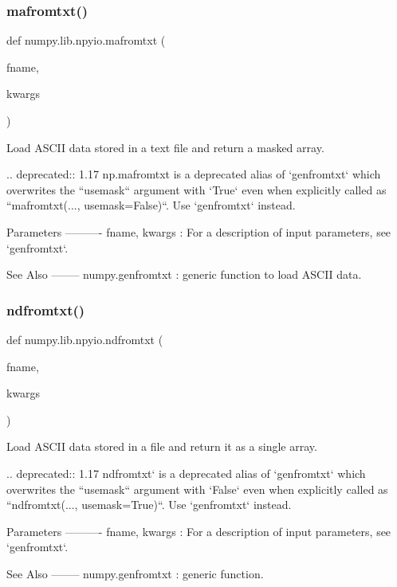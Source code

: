 \subsubsection{\texorpdfstring{mafromtxt()}{mafromtxt()}}
{\footnotesize\ttfamily def numpy.\+lib.\+npyio.\+mafromtxt (\begin{DoxyParamCaption}\item[{}]{fname,  }\item[{}]{kwargs }\end{DoxyParamCaption})}

\begin{DoxyVerb}Load ASCII data stored in a text file and return a masked array.

.. deprecated:: 1.17
    np.mafromtxt is a deprecated alias of `genfromtxt` which
    overwrites the ``usemask`` argument with `True` even when
    explicitly called as ``mafromtxt(..., usemask=False)``.
    Use `genfromtxt` instead.

Parameters
----------
fname, kwargs : For a description of input parameters, see `genfromtxt`.

See Also
--------
numpy.genfromtxt : generic function to load ASCII data.\end{DoxyVerb}
 \mbox{\label{namespacenumpy_1_1lib_1_1npyio_af96203ee43401b14ba9a590915a918b6}} 
\subsubsection{\texorpdfstring{ndfromtxt()}{ndfromtxt()}}
{\footnotesize\ttfamily def numpy.\+lib.\+npyio.\+ndfromtxt (\begin{DoxyParamCaption}\item[{}]{fname,  }\item[{}]{kwargs }\end{DoxyParamCaption})}

\begin{DoxyVerb}Load ASCII data stored in a file and return it as a single array.

.. deprecated:: 1.17
    ndfromtxt` is a deprecated alias of `genfromtxt` which
    overwrites the ``usemask`` argument with `False` even when
    explicitly called as ``ndfromtxt(..., usemask=True)``.
    Use `genfromtxt` instead.

Parameters
----------
fname, kwargs : For a description of input parameters, see `genfromtxt`.

See Also
--------
numpy.genfromtxt : generic function.\end{DoxyVerb}
 \mbox{\label{namespacenumpy_1_1lib_1_1npyio_a6461d162ba9cde777930873522666cd9}} 
